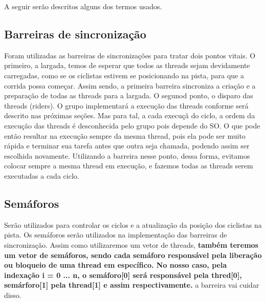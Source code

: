 \documentclass[12pt,a4paper]{article}
\begin{document}
	A seguir serão descritos alguns dos termos usados.
    

\subsection{Barreiras de sincronização}

	Foram utilizadas as barreiras de sincronizações para tratar dois pontos vitais. 
    O primeiro, a largada, temos de esperar que todos as threads sejam devidamente carregadas, como se os ciclistas estivem se posicionando na pista, para que a corrida possa começar. Assim sendo, a primeira barreira sincroniza a criação e a preparação de todas as threads para a largada.
    O segunod ponto, o disparo das threads (riders). O grupo implementará a execução das threads conforme será descrito nas próximas seções. Mas para tal, a cada execuçã do ciclo, a ordem da execução das threads é desconhecida pelo grupo pois depende do SO. O que pode então resultar na execução sempre da mesma thread, pois ela pode ser muito rápida e terminar sua tarefa antes que outra seja chamada, podendo assim ser escolhida novamente. Utilizando a barreira nesse ponto, dessa forma, evitamos colocar sempre a mesma thread em execução, e fazemos todas as threads serem executadas a cada ciclo.


\subsection{Semáforos}

	Serão utilizados para controlar os ciclos e a atualização da posição dos ciclistas na pista.
	Os semáforos serão utilizados na implementação das barreiras de sincronização. Assim como utilizaremos um vetor de threads, \textbf{também teremos um vetor de semáforos, sendo cada semáforo responsável pela liberação ou bloqueio de uma thread em específico. No nosso caso, pela indexação i = 0 ... n, o semáforo[0] será responsável pela thred[0], semárforo[1] pela thread[1] e assim respectivamente. 
} a barreira vai cuidar disso.

\end{document}
